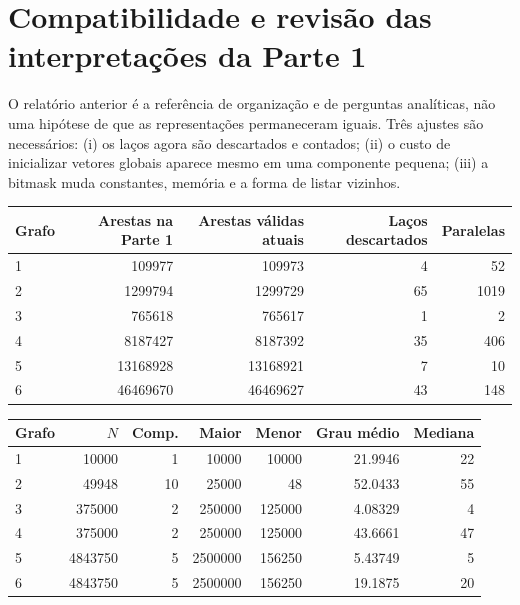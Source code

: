 \documentclass[a4paper,12pt]{article}
\begin{document}
\section{Compatibilidade e revisão das interpretações da Parte 1}
O relatório anterior é a referência de organização e de perguntas analíticas, não uma hipótese de que as representações permaneceram iguais. Três ajustes são necessários: (i) os laços agora são descartados e contados; (ii) o custo de inicializar vetores globais aparece mesmo em uma componente pequena; (iii) a bitmask muda constantes, memória e a forma de listar vizinhos.
\par\smallskip\noindent\begin{minipage}{\textwidth}\centering
\begingroup\fontsize{9}{11}\selectfont
\setlength{\tabcolsep}{4pt}
\begin{tabular}{lrrrr}
\toprule
Grafo & Arestas na Parte 1 & Arestas válidas atuais & Laços descartados & Paralelas \\
\midrule
1 & \num{109977} & \num{109973} & \num{4} & \num{52} \\
2 & \num{1299794} & \num{1299729} & \num{65} & \num{1019} \\
3 & \num{765618} & \num{765617} & \num{1} & \num{2} \\
4 & \num{8187427} & \num{8187392} & \num{35} & \num{406} \\
5 & \num{13168928} & \num{13168921} & \num{7} & \num{10} \\
6 & \num{46469670} & \num{46469627} & \num{43} & \num{148} \\
\bottomrule
\end{tabular}
\endgroup
{}
\end{minipage}\par\smallskip
\par\smallskip\noindent\begin{minipage}{\textwidth}\centering
\begingroup\fontsize{9}{11}\selectfont
\setlength{\tabcolsep}{4pt}
\begin{tabular}{lrrrrrr}
\toprule
Grafo & $N$ & Comp. & Maior & Menor & Grau médio & Mediana \\
\midrule
1 & \num{10000} & \num{1} & \num{10000} & \num{10000} & \num{21.9946} & \num{22} \\
2 & \num{49948} & \num{10} & \num{25000} & \num{48} & \num{52.0433} & \num{55} \\
3 & \num{375000} & \num{2} & \num{250000} & \num{125000} & \num{4.08329} & \num{4} \\
4 & \num{375000} & \num{2} & \num{250000} & \num{125000} & \num{43.6661} & \num{47} \\
5 & \num{4843750} & \num{5} & \num{2500000} & \num{156250} & \num{5.43749} & \num{5} \\
6 & \num{4843750} & \num{5} & \num{2500000} & \num{156250} & \num{19.1875} & \num{20} \\
\bottomrule
\end{tabular}
\endgroup
\end{minipage}\par\smallskip
\end{document}
